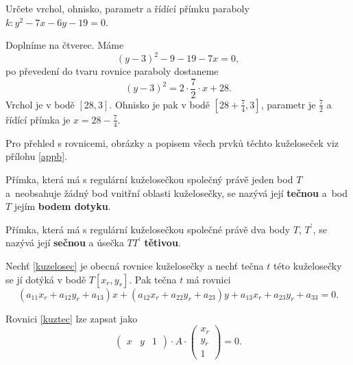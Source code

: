 \begin{priklad}
Určete vrchol, ohnisko, parametr a řídící přímku paraboly $k\colon y^2-7x-6y-19=0.$
\end{priklad}

\begin{reseni}
Doplníme na čtverec. Máme
$$
    (y-3)^2 - 9-19-7x=0,
$$
po převedení do tvaru rovnice paraboly dostaneme
$$
    (y-3)^2 = 2 \cdot \frac{7}{2}\cdot  x + 28.
$$
Vrchol je v bodě $[28,3]$. Ohnisko je pak v bodě $[28 + \frac{7}{4}, 3]$, parametr je $\frac{7}{2}$ a řídící přímka
je $x = 28 - \frac{7}{4}$.
\end{reseni}

\begin{pozn}
    Pro přehled s rovnicemi, obrázky a popisem všech prvků těchto kuželoseček
    viz přílohu \ref{appb}.
\end{pozn}

\begin{definition}
    Přímka, která má s regulární kuželosečkou společný právě jeden bod $T$ a~neobsahuje
    žádný bod vnitřní oblasti kuželosečky, se nazývá její \textbf{tečnou} a~bod
    $T$ jejím \textbf{bodem dotyku}.
\end{definition}

\begin{definition}
Přímka, která má s regulární kuželosečkou společné právě dva body $T$, $T^\prime$, se
nazývá její \textbf{sečnou} a úsečka $TT^\prime$ \textbf{tětivou}.
\end{definition}

\begin{veta}
    Nechť \ref{kuzelosec} je obecná rovnice kuželosečky a nechť tečna $t$ této
    kuželosečky se jí dotýká v bodě $T[x_r, y_r].$ Pak tečna $t$ má rovnici
    \begin{equation}\label{kuztec}
        (a_{11}x_r+a_{12}y_r+a_{13})x+(a_{12}x_r+a_{22}y_r+a_{23})y+a_{13}x_r +
        a_{23}y_r+a_{33}=0.
    \end{equation}
\end{veta}

\begin{pozn}
    Rovnici \ref{kuztec} lze zapsat jako
    $$
    \begin{pmatrix}
        x & y & 1
    \end{pmatrix}\cdot A \cdot \begin{pmatrix}
        x_r \\
        y_r \\
        1
    \end{pmatrix}=0.
    $$
\end{pozn}

